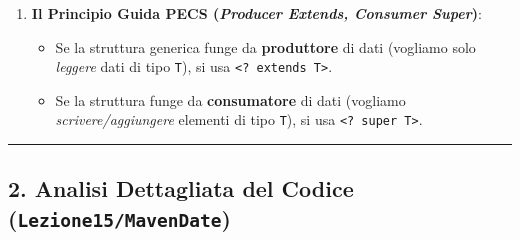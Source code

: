 \documentclass[11pt,a4paper]{article}
\newcommand{\passthrough}[1]{#1}
\providecommand{\tightlist}{\setlength{\itemsep}{0pt}\setlength{\parskip}{0pt}}
\begin{document}
\begin{enumerate}
\begin{itemize}
\begin{lstlisting}[language=Java]
System.out.println(pairP.getFirst().getName()); // OK!
\end{lstlisting}
  \item
    \textbf{Sintassi pulita nei metodi}: Invece di dichiarare un
    parametro formale di tipo esplicito a livello di metodo:

\begin{lstlisting}[language=Java]
<T extends Person> void printPair(Pair<T> p) { ... }
\end{lstlisting}

    possiamo scrivere in modo molto più compatto e leggibile:

\begin{lstlisting}[language=Java]
void printPair(Pair<? extends Person> p) { ... }
\end{lstlisting}
  \end{itemize}
\item
  \textbf{Il Principio Guida PECS (\emph{Producer Extends, Consumer
  Super})}:

  \begin{itemize}
  \tightlist
  \item
    Se la struttura generica funge da \textbf{produttore} di dati
    (vogliamo solo \emph{leggere} dati di tipo
    \passthrough{\lstinline!T!}), si usa
    \passthrough{\lstinline!<? extends T>!}.
  \item
    Se la struttura funge da \textbf{consumatore} di dati (vogliamo
    \emph{scrivere/aggiungere} elementi di tipo
    \passthrough{\lstinline!T!}), si usa
    \passthrough{\lstinline!<? super T>!}.
  \end{itemize}
\end{enumerate}

\begin{center}\rule{0.5\linewidth}{0.5pt}\end{center}

\subsection{\texorpdfstring{2. Analisi Dettagliata del Codice
(\texttt{Lezione15/MavenDate})}{2. Analisi Dettagliata del Codice (Lezione15/MavenDate)}}\label{analisi-dettagliata-del-codice-lezione15mavendate}
\end{document}
